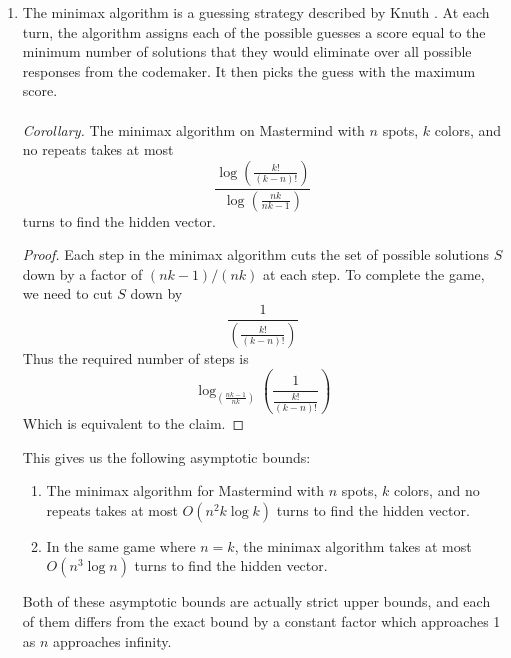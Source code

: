 \documentclass[12pt, a4paper]{article}
\begin{document}
\begin{enumerate}
\begin{proof}
\begin{enumerate}[label=]
			Otherwise we have
			\begin{equation*}|C_{\alpha}|>\frac{nk-1}{nk}|S|\end{equation*}
			Then, this satisfies the conditions for Case 1 above, where we have a
			guess whose largest bucket is $B_j$ with $j>0$.
			\end{enumerate}
		\end{proof}
	\item The minimax algorithm is a guessing strategy described by Knuth \cite{DK76}.
	At each turn, the algorithm assigns each of the possible guesses a score equal
	to the minimum number of solutions that they would eliminate over all
	possible responses from the codemaker. It then picks the guess with the maximum
	score.\\\\
	\textit{Corollary.} The minimax algorithm on Mastermind with $n$ spots, $k$
	colors, and no repeats takes at most
		\begin{equation*}
		\frac{\log\left(\frac{k!}{(k-n)!}\right)}{\log\left(\frac{nk}{nk-1}\right)}
		\end{equation*}
	turns to find the hidden vector.
		\begin{proof}
		Each step in the minimax algorithm cuts the set of possible solutions $S$ down
		by a factor of $(nk-1)/(nk)$ at each step. To complete the game, we need to
		cut $S$ down by
			\begin{equation*}
			\frac{1}{\left(\frac{k!}{(k-n)!}\right)}
			\end{equation*}
		Thus the required number of steps is
			\begin{equation*}
			\log_{\left(\frac{nk-1}{nk}\right)}\left(\frac{1}{\frac{k!}{(k-n)!}}\right)
			\end{equation*}
		Which is equivalent to the claim.
		\end{proof}
	This gives us the following asymptotic bounds:
		\begin{enumerate}[label=\roman*.]
		\item The minimax algorithm for Mastermind with $n$ spots, $k$
		colors, and no repeats takes at most $O(n^2k\log k)$ turns to find the
		hidden vector.
		
		\item In the same game where $n=k$, the minimax algorithm takes at most
		$O(n^3\log n)$ turns to find the hidden vector.
		\end{enumerate}
	Both of these asymptotic bounds are actually strict upper bounds, and 
	each of them differs from the exact bound by a constant factor which approaches
	1 as $n$ approaches infinity.
	\end{enumerate}
	
\end{document}
